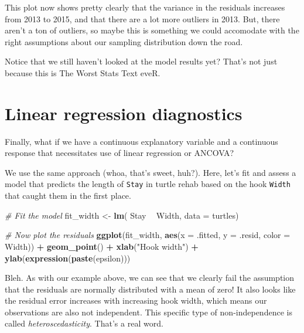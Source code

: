 \documentclass[
]{book}
\newenvironment{Shaded}{\begin{snugshade}}{\end{snugshade}}
\newcommand{\CommentTok}[1]{\textcolor[rgb]{0.56,0.35,0.01}{\textit{#1}}}
\newcommand{\DataTypeTok}[1]{\textcolor[rgb]{0.13,0.29,0.53}{#1}}
\newcommand{\KeywordTok}[1]{\textcolor[rgb]{0.13,0.29,0.53}{\textbf{#1}}}
\newcommand{\NormalTok}[1]{#1}
\newcommand{\OperatorTok}[1]{\textcolor[rgb]{0.81,0.36,0.00}{\textbf{#1}}}
\newcommand{\StringTok}[1]{\textcolor[rgb]{0.31,0.60,0.02}{#1}}
\begin{document}
This plot now shows pretty clearly that the variance in the residuals increases from 2013 to 2015, and that there are a lot more outliers in 2013. But, there aren't a ton of outliers, so maybe this is something we could accomodate with the right assumptions about our sampling distribution down the road.

Notice that we still haven't looked at the model results yet? That's not just because this is The Worst Stats Text eveR.

\hypertarget{linear-regression-diagnostics}{%
\section{Linear regression diagnostics}\label{linear-regression-diagnostics}}

Finally, what if we have a continuous explanatory variable and a continuous response that necessitates use of linear regression or ANCOVA?

We use the same approach (whoa, that's sweet, huh?). Here, let's fit and assess a model that predicts the length of \texttt{Stay} in turtle rehab based on the hook \texttt{Width} that caught them in the first place.

\begin{Shaded}
\begin{Highlighting}[]
\CommentTok{# Fit the model}
\NormalTok{fit_width <-}\StringTok{ }\KeywordTok{lm}\NormalTok{( Stay }\OperatorTok{~}\StringTok{ }\NormalTok{Width, }\DataTypeTok{data =}\NormalTok{ turtles)}

\CommentTok{# Now plot the residuals}
\KeywordTok{ggplot}\NormalTok{(fit_width, }\KeywordTok{aes}\NormalTok{(}\DataTypeTok{x =}\NormalTok{ .fitted, }\DataTypeTok{y =}\NormalTok{ .resid, }\DataTypeTok{color =}\NormalTok{ Width)) }\OperatorTok{+}\StringTok{ }
\StringTok{  }\KeywordTok{geom_point}\NormalTok{() }\OperatorTok{+}
\StringTok{  }\KeywordTok{xlab}\NormalTok{(}\StringTok{"Hook width"}\NormalTok{) }\OperatorTok{+}\StringTok{ }
\StringTok{  }\KeywordTok{ylab}\NormalTok{(}\KeywordTok{expression}\NormalTok{(}\KeywordTok{paste}\NormalTok{(epsilon)))}
\end{Highlighting}
\end{Shaded}

Bleh. As with our example above, we can see that we clearly fail the assumption that the residuals are normally distributed with a mean of zero! It also looks like the residual error increases with increasing hook width, which means our observations are also not independent. This specific type of non-independence is called \emph{heteroscedasticity}. That's a real word.
\end{document}

